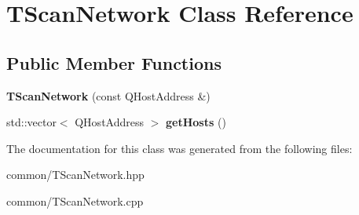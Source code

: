 \hypertarget{class_t_scan_network}{}\section{T\+Scan\+Network Class Reference}
\label{class_t_scan_network}
\subsection*{Public Member Functions}
\begin{DoxyCompactItemize}
\item 
\mbox{\label{class_t_scan_network_a095bba354d4fa6ea8001d96da88ca3c3}} 
{\bfseries T\+Scan\+Network} (const Q\+Host\+Address \&)
\item 
\mbox{\label{class_t_scan_network_adf3e28695f0f7ca184e738059341f504}} 
std\+::vector$<$ Q\+Host\+Address $>$ {\bfseries get\+Hosts} ()
\end{DoxyCompactItemize}


The documentation for this class was generated from the following files\+:\begin{DoxyCompactItemize}
\item 
common/T\+Scan\+Network.\+hpp\item 
common/T\+Scan\+Network.\+cpp\end{DoxyCompactItemize}
